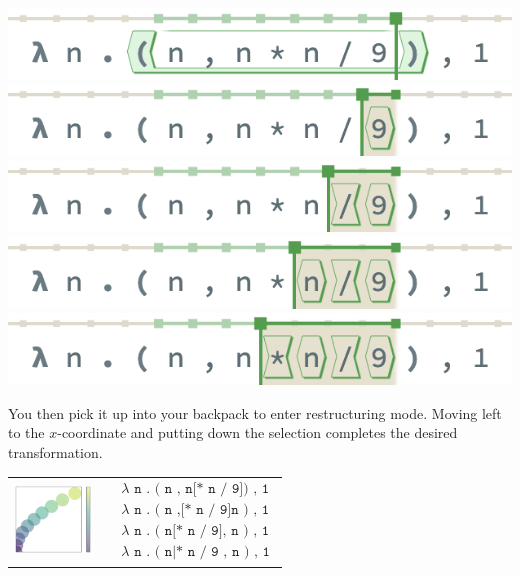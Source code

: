\begin{minipage}{0.65\columnwidth}
  \includegraphics[width=\textwidth]{img/selection-whole-0.png}
  \includegraphics[width=\textwidth]{img/selection-whole-1.png}
  \includegraphics[width=\textwidth]{img/selection-whole-2.png}
  \includegraphics[width=\textwidth]{img/selection-whole-3.png}
  \includegraphics[width=\textwidth]{img/selection-whole-4.png}
\end{minipage}
You then pick it up into your backpack to enter
restructuring mode.
Moving left to the $x$-coordinate and putting down
the selection completes the desired transformation.

\noindent
\begin{tabular}{cp{7cm}}
\includegraphics[width=2cm]{img/circles-parabola-transpose.png}
&
{
\begin{align*}
  & \texttt{$\lambda$ n . ( n , n[* n / 9]) , 1} \\
  & \texttt{$\lambda$ n . ( n ,[* n / 9]n ) , 1} \\
  & \texttt{$\lambda$ n . ( n[* n / 9], n ) , 1} \\
  & \texttt{$\lambda$ n . ( n|* n / 9 , n ) , 1}
\end{align*}
}
\end{tabular}

